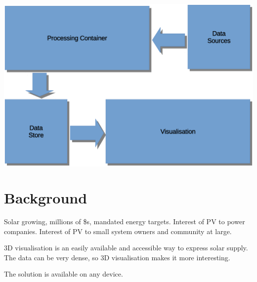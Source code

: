\documentclass[10pt, a4paper]{article}
\begin{document}
\begin{multicols}{2}





\includegraphics[scale=0.17]{design1.eps}

\section{Background}

Solar growing, millions of \$s, mandated energy targets.
Interest of PV to power companies.
Interest of PV to small system owners and community at large.

3D visualisation is an easily available and accessible way to express solar supply. The data can be very dense, so 3D visualisation makes it more interesting.

The solution is available on any device.


\end{multicols}
\end{document}
